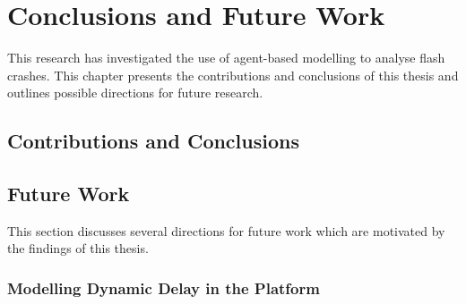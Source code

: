 %



\chapter{Conclusions and Future Work}
\label{chap:conclusions}

This research has investigated the use of agent-based modelling to analyse flash crashes.
This chapter presents the contributions and conclusions of this thesis and outlines possible directions for future research.


\section{Contributions and Conclusions}


\section{Future Work}
\label{sec:conclusion:future-work}

This section discusses several directions for future work which are motivated by the findings of this thesis.

\subsection{Modelling Dynamic Delay in the Platform}

